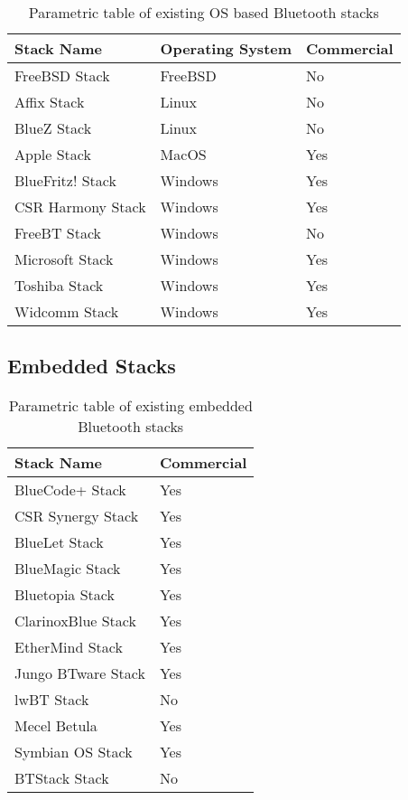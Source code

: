 \begin{table}
	\begin{center}
		\begin{tabular}{ | l | l | l |}
			\hline
			\textbf{Stack Name} & \textbf{Operating System} & \textbf{Commercial} \\ \hline

			FreeBSD Stack & FreeBSD & No \\ \hline
			Affix Stack & Linux & No \\ \hline
			BlueZ Stack & Linux & No \\ \hline
			Apple Stack & MacOS & Yes \\ \hline
			BlueFritz! Stack & Windows & Yes \\ \hline
			CSR Harmony Stack & Windows & Yes \\ \hline
			FreeBT Stack & Windows & No \\ \hline
			Microsoft Stack & Windows & Yes \\ \hline
			Toshiba Stack & Windows & Yes \\ \hline
			Widcomm Stack & Windows & Yes \\ \hline
			\hline
		\end{tabular}
		\caption[Existing Operating System Bluetooth Stacks]{Parametric table of existing OS based Bluetooth stacks}
		\label{tab:osbtstacks}
	\end{center}
\end{table}


\subsection{Embedded Stacks}

\begin{table}
	\begin{center}
		\begin{tabular}{ | l | l |}
			\hline
			\textbf{Stack Name} & \textbf{Commercial} \\ \hline

			BlueCode+ Stack & Yes \\ \hline
			CSR Synergy Stack & Yes \\ \hline
			BlueLet Stack & Yes \\ \hline
			BlueMagic Stack & Yes \\ \hline
			Bluetopia Stack & Yes \\ \hline
			ClarinoxBlue Stack & Yes \\ \hline
			EtherMind Stack & Yes \\ \hline
			Jungo BTware Stack & Yes \\ \hline
			lwBT Stack & No \\ \hline
			Mecel Betula & Yes \\ \hline
			Symbian OS Stack & Yes \\ \hline
			BTStack Stack & No \\ \hline
			\hline
		\end{tabular}
		\caption[Existing Embedded Bluetooth Stacks]{Parametric table of existing embedded Bluetooth stacks}
		\label{tab:embbtstacks}
	\end{center}
\end{table}


